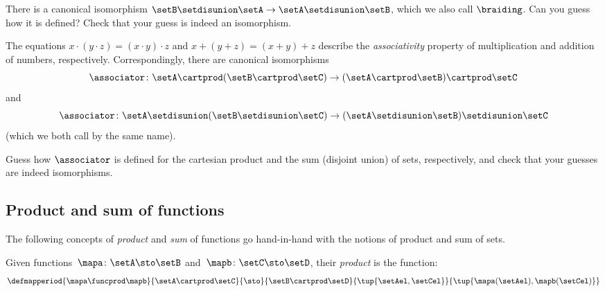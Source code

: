 \begin{exercise}\label{ex:braiding-disjoint-union}
There is a canonical isomorphism $\setB \setdisunion \setA \to \setA \setdisunion \setB$, which we also call $\braiding$. Can you guess how it is defined? Check that your guess is indeed an isomorphism. 
\end{exercise}

The equations $x \cdot (y \cdot z)  = (x \cdot y) \cdot z$ and $x + (y + z) = (x + y) + z$ describe the \emph{associativity} property of multiplication and addition of numbers, respectively. Correspondingly, there are canonical isomorphisms
\begin{equation}
\associator \colon  \setA \cartprod (\setB \cartprod \setC) \to (\setA \cartprod \setB) \cartprod \setC
\end{equation}
and 
\begin{equation}
\associator \colon \setA \setdisunion (\setB \setdisunion \setC) \to (\setA \setdisunion \setB) \setdisunion \setC 
\end{equation}
(which we both call by the same name). 

\begin{exercise}\label{ex:associator-cart-prod-and-disjoint-union}
Guess how $\associator$ is defined for the cartesian product and the sum (disjoint union) of sets, respectively, and check that your guesses are indeed isomorphisms.
\end{exercise}




\subsection{Product and sum of functions}
\label{sec:prod_dirsum_functions}

The following concepts of \emph{product} and \emph{sum} of functions go hand-in-hand with the notions of product and sum of sets.

\begin{ctdefinition}
    \label{def:product-of-functions}
    Given functions~$\mapa\colon \setA \sto \setB$ and~$\mapb\colon \setC \sto \setD$, their \emph{product} is the function:
    \begin{equation}
        \defmapperiod{
            \mapa \funcprod \mapb
        }{
            \setA \cartprod \setC
        }{
            \sto
        }{
            \setB\cartprod \setD
        }{
            \tup{\setAel, \setCel}
        }{
            \tup{\mapa(\setAel),\mapb(\setCel)}
        }
    \end{equation}
\end{ctdefinition}

